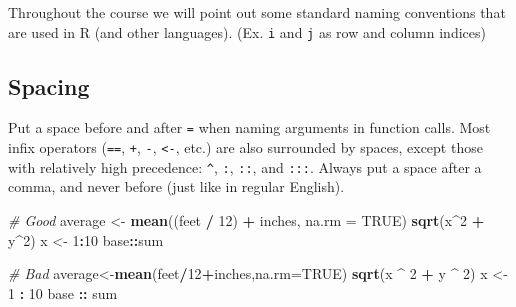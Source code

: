 \documentclass[]{book}
\newenvironment{Shaded}{\begin{snugshade}}{\end{snugshade}}
\newcommand{\KeywordTok}[1]{\textcolor[rgb]{0.13,0.29,0.53}{\textbf{#1}}}
\newcommand{\DataTypeTok}[1]{\textcolor[rgb]{0.13,0.29,0.53}{#1}}
\newcommand{\DecValTok}[1]{\textcolor[rgb]{0.00,0.00,0.81}{#1}}
\newcommand{\StringTok}[1]{\textcolor[rgb]{0.31,0.60,0.02}{#1}}
\newcommand{\CommentTok}[1]{\textcolor[rgb]{0.56,0.35,0.01}{\textit{#1}}}
\newcommand{\OtherTok}[1]{\textcolor[rgb]{0.56,0.35,0.01}{#1}}
\newcommand{\OperatorTok}[1]{\textcolor[rgb]{0.81,0.36,0.00}{\textbf{#1}}}
\newcommand{\NormalTok}[1]{#1}
\theoremstyle{definition}
\theoremstyle{definition}
\theoremstyle{definition}
\theoremstyle{remark}
\begin{document}
Throughout the course we will point out some standard naming conventions
that are used in R (and other languages). (Ex. \texttt{i} and \texttt{j}
as row and column indices)

\begin{Shaded}
\end{Shaded}

\subsection{Spacing}\label{spacing}

Put a space before and after \texttt{=} when naming arguments in
function calls. Most infix operators (\texttt{==}, \texttt{+},
\texttt{-}, \texttt{\textless{}-}, etc.) are also surrounded by spaces,
except those with relatively high precedence: \texttt{\^{}}, \texttt{:},
\texttt{::}, and \texttt{:::}. Always put a space after a comma, and
never before (just like in regular English).

\begin{Shaded}
\begin{Highlighting}[]
\CommentTok{# Good}
\NormalTok{average <-}\StringTok{ }\KeywordTok{mean}\NormalTok{((feet }\OperatorTok{/}\StringTok{ }\DecValTok{12}\NormalTok{) }\OperatorTok{+}\StringTok{ }\NormalTok{inches, }\DataTypeTok{na.rm =} \OtherTok{TRUE}\NormalTok{)}
\KeywordTok{sqrt}\NormalTok{(x}\OperatorTok{^}\DecValTok{2} \OperatorTok{+}\StringTok{ }\NormalTok{y}\OperatorTok{^}\DecValTok{2}\NormalTok{)}
\NormalTok{x <-}\StringTok{ }\DecValTok{1}\OperatorTok{:}\DecValTok{10}
\NormalTok{base}\OperatorTok{::}\NormalTok{sum}

\CommentTok{# Bad}
\NormalTok{average<-}\KeywordTok{mean}\NormalTok{(feet}\OperatorTok{/}\DecValTok{12}\OperatorTok{+}\NormalTok{inches,}\DataTypeTok{na.rm=}\OtherTok{TRUE}\NormalTok{)}
\KeywordTok{sqrt}\NormalTok{(x }\OperatorTok{^}\StringTok{ }\DecValTok{2} \OperatorTok{+}\StringTok{ }\NormalTok{y }\OperatorTok{^}\StringTok{ }\DecValTok{2}\NormalTok{)}
\NormalTok{x <-}\StringTok{ }\DecValTok{1} \OperatorTok{:}\StringTok{ }\DecValTok{10}
\NormalTok{base }\OperatorTok{::}\StringTok{ }\NormalTok{sum}
\end{Highlighting}
\end{Shaded}
\end{document}
